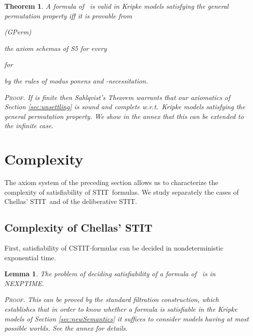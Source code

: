 \documentclass{article}
\newtheorem{theorem}{Theorem}
\newtheorem{lemma}{Lemma}
\newenvironment{pf}{\em \medskip\noindent \textsc{Proof.}}
{\hspace*{\fill}\nolinebreak[2]\hspace*{\fill}\medskip}
\newcommand{\STIT} {{\textsf{STIT}}}              \newcommand{\CSTIT}{{\textsf{CSTIT}}}            \newcommand{\DSTIT}{{\textsf{DSTIT}}}
\newcommand{\LCSTIT}{}
\begin{document}
\begin{theorem}\label{theo:Sahlqvist}
A formula of \LCSTIT\ is valid in Kripke models satisfying the general permutation property
iff it is provable from
\begin{itemlist}{(GPerm)}
\item[S5()]     the axiom schemas of S5 for every 
\item[Def()] 
\item[(GPerm)] 
                    \hfill for 
\end{itemlist}
by the rules of modus ponens and -necessitation.

\begin{pf}
If  is finite then
Sahlqvist's Theorem warrants that our axiomatics of Section \ref{sec:unsettling}
is sound and complete w.r.t.\ Kripke models satisfying the general permutation property.
We show in the annex that this can be extended to the infinite case.\end{pf}
\end{theorem}





\goodbreak
\section{Complexity}\label{sec:complexity}


The axiom system of the preceding section allows us to characterize the complexity
of satisfiability of \STIT\ formulas.
We study separately the cases of Chellas' \STIT\ and of the 
deliberative \STIT.

\subsection{Complexity of Chellas' \STIT}

First, satisfiability of \CSTIT-formulas
can be decided in nondeterministic exponential time.

\begin{lemma}\label{lem:ComplexCstitUpper}
The problem of deciding satisfiability of a formula of \LCSTIT\ 
is in NEXPTIME.

\begin{pf}
This can be proved by the standard filtration construction,
which establishes that in order to know whether a formula 
is satisfiable in the Kripke models of Section \ref{sec:newSemantics}
it suffices to consider models having at most  possible worlds.
See the annex for details.
\end{pf}

\end{lemma}
\end{document}
